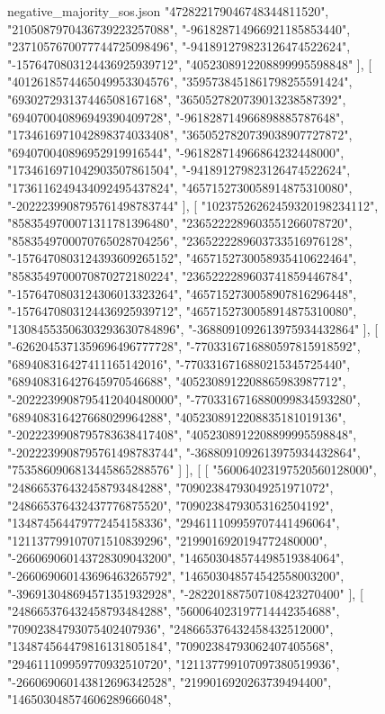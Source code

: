 \begin{filecontents*}[overwrite]{negative_majority_sos.json}
    "472822179046748344811520",
    "2105087970436739223257088",
    "-961828714966921185853440",
    "2371057670077744725098496",
    "-941891279823126474522624",
    "-1576470803124436925939712",
    "4052308912208899995598848"
   ],
   [
    "4012618574465049953304576",
    "3595738451861798255591424",
    "693027293137446508167168",
    "3650527820739013238587392",
    "694070040896949390409728",
    "-961828714966898885787648",
    "1734616971042898374033408",
    "3650527820739038907727872",
    "694070040896952919916544",
    "-961828714966864232448000",
    "1734616971042903507861504",
    "-941891279823126474522624",
    "1736116249434092495437824",
    "4657152730058914875310080",
    "-2022239908795761498783744"
   ],
   [
    "10237526262459320198234112",
    "8583549700071311781396480",
    "2365222289603551266078720",
    "8583549700070765028704256",
    "2365222289603733516976128",
    "-1576470803124393609265152",
    "4657152730058935410622464",
    "8583549700070870272180224",
    "2365222289603741859446784",
    "-1576470803124306013323264",
    "4657152730058907816296448",
    "-1576470803124436925939712",
    "4657152730058914875310080",
    "13084553506303293630784896",
    "-3688091092613975934432864"
   ],
   [
    "-6262045371359696496777728",
    "-7703316716880597815918592",
    "689408316427411165142016",
    "-7703316716880215345725440",
    "689408316427645970546688",
    "4052308912208865983987712",
    "-2022239908795412040480000",
    "-7703316716880099834593280",
    "689408316427668029964288",
    "4052308912208835181019136",
    "-2022239908795783638417408",
    "4052308912208899995598848",
    "-2022239908795761498783744",
    "-3688091092613975934432864",
    "7535860906813445865288576"
   ]
  ],
  [
   [
    "560064023197520560128000",
    "248665376432458793484288",
    "70902384793049251971072",
    "248665376432437776875520",
    "70902384793053162504192",
    "134874564479772454158336",
    "294611109959707441496064",
    "121137799107071510839296",
    "2199016920194772480000",
    "-266069060143728309043200",
    "146503048574498519384064",
    "-266069060143696463265792",
    "146503048574542558003200",
    "-396913048694571351932928",
    "-282201887507108423270400"
   ],
   [
    "248665376432458793484288",
    "560064023197714442354688",
    "70902384793075402407936",
    "248665376432458432512000",
    "134874564479816131805184",
    "70902384793062407405568",
    "294611109959770932510720",
    "121137799107097380519936",
    "-266069060143812696342528",
    "2199016920263739494400",
    "146503048574606289666048",

\end{filecontents*}
